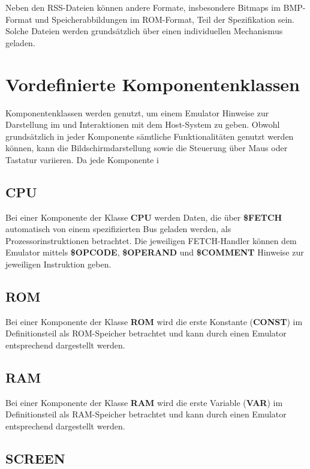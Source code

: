 \documentclass{scrartcl}
\begin{document}
\vspace{10pt}
\noindent Neben den RSS-Dateien können andere Formate, insbesondere Bitmaps im BMP-Format und Speicherabbildungen im ROM-Format, Teil der Spezifikation sein. Solche Dateien werden grundsätzlich über einen individuellen Mechanismus geladen.

\section{Vordefinierte Komponentenklassen}

\noindent Komponentenklassen werden genutzt, um einem Emulator Hinweise zur Darstellung im und Interaktionen mit dem Host-System zu geben. Obwohl grundsätzlich in jeder Komponente sämtliche Funktionalitäten genutzt werden können, kann die Bildschirmdarstellung sowie die Steuerung über Maus oder Tastatur variieren. Da jede Komponente i

\subsection{CPU}

\noindent Bei einer Komponente der Klasse \textbf{CPU} werden Daten, die über \textbf{\$FETCH} automatisch von einem spezifizierten Bus geladen werden, als Prozessorinstruktionen betrachtet. Die jeweiligen FETCH-Handler können dem Emulator mittels \textbf{\$OPCODE}, \textbf{\$OPERAND} und \textbf{\$COMMENT} Hinweise zur jeweiligen Instruktion geben.

\subsection{ROM}

\noindent Bei einer Komponente der Klasse \textbf{ROM} wird die erste Konstante (\textbf{CONST}) im Definitionsteil als ROM-Speicher betrachtet und kann durch einen Emulator entsprechend dargestellt werden.

\subsection{RAM}

\noindent Bei einer Komponente der Klasse \textbf{RAM} wird die erste Variable (\textbf{VAR}) im Definitionsteil als RAM-Speicher betrachtet und kann durch einen Emulator entsprechend dargestellt werden.

\subsection{SCREEN}
\end{document}
